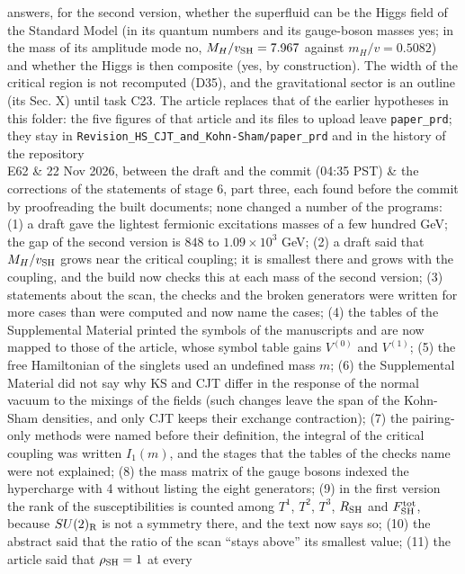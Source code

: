 \documentclass[
  10pt,
]{article}
\begin{document}
\begin{longtable}[]
answers, for the second version, whether the superfluid can be the Higgs
field of the Standard Model (in its quantum numbers and its gauge-boson
masses yes; in the mass of its amplitude mode no,
\(M_H/v_{\rm SH}=7.967\) against \(m_H/v=0.5082\)) and whether the Higgs
is then composite (yes, by construction). The width of the critical
region is not recomputed (D35), and the gravitational sector is an
outline (its Sec. X) until task C23. The article replaces that of the
earlier hypotheses in this folder: the five figures of that article and
its files to upload leave \texttt{paper\_prd}; they stay in
\texttt{Revision\_HS\_CJT\_and\_Kohn-Sham/paper\_prd} and in the history
of the repository \\
E62 & 22 Nov 2026, between the draft and the commit (04:35 PST) & the
corrections of the statements of stage 6, part three, each found before
the commit by proofreading the built documents; none changed a number of
the programs: (1) a draft gave the lightest fermionic excitations masses
of a few hundred GeV; the gap of the second version is \(848\) to
\(1.09\times10^{3}\) GeV; (2) a draft said that \(M_H/v_{\rm SH}\) grows
near the critical coupling; it is smallest there and grows with the
coupling, and the build now checks this at each mass of the second
version; (3) statements about the scan, the checks and the broken
generators were written for more cases than were computed and now name
the cases; (4) the tables of the Supplemental Material printed the
symbols of the manuscripts and are now mapped to those of the article,
whose symbol table gains \(V^{(0)}\) and \(V^{(1)}\); (5) the free
Hamiltonian of the singlets used an undefined mass \(m\); (6) the
Supplemental Material did not say why KS and CJT differ in the response
of the normal vacuum to the mixings of the fields (such changes leave
the span of the Kohn-Sham densities, and only CJT keeps their exchange
contraction); (7) the pairing-only methods were named before their
definition, the integral of the critical coupling was written
\(I_1(m)\), and the stages that the tables of the checks name were not
explained; (8) the mass matrix of the gauge bosons indexed the
hypercharge with 4 without listing the eight generators; (9) in the
first version the rank of the susceptibilities is counted among \(T^1\),
\(T^2\), \(T^3\), \(R_{\rm SH}\) and \(F^{\rm tot}_{\rm SH}\), because
\(SU(2)_{\rm R}\) is not a symmetry there, and the text now says so;
(10) the abstract said that the ratio of the scan ``stays above'' its
smallest value; (11) the article said that \(\rho_{\rm SH}=1\) at every

\end{longtable}
\end{document}
